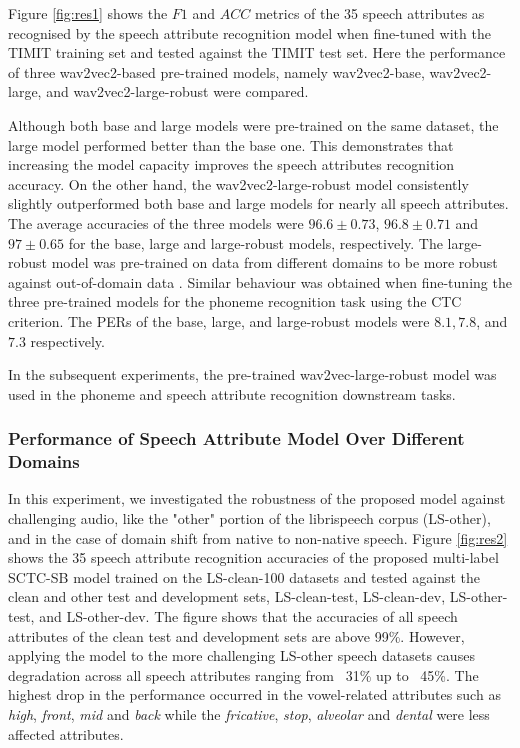 \documentclass[12pt]{elsarticle}
\begin{document}
Figure \ref{fig:res1} shows the $F1$ and $ACC$ metrics of the 35 speech attributes as recognised by the speech attribute recognition model when fine-tuned with the TIMIT training set and tested against the TIMIT test set. Here the performance of three wav2vec2-based pre-trained models, namely wav2vec2-base, wav2vec2-large, and wav2vec2-large-robust were compared.

Although both base and large models were pre-trained on the same dataset, the large model performed better than the base one. This demonstrates that increasing the model capacity improves the speech attributes recognition accuracy. On the other hand, the wav2vec2-large-robust model consistently slightly outperformed both base and large models for nearly all speech attributes. The average accuracies of the three models were $96.6\pm0.73$, $96.8\pm0.71$ and $97\pm0.65$ for the base, large and large-robust models, respectively. The large-robust model was pre-trained on data from different domains to be more robust against out-of-domain data \cite{RN231}. Similar behaviour was obtained when fine-tuning the three pre-trained models for the phoneme recognition task using the CTC criterion. The PERs of the base, large, and large-robust models were $8.1, 7.8$, and $7.3$ respectively.

In the subsequent experiments, the pre-trained wav2vec-large-robust model was used in the phoneme and speech attribute recognition downstream tasks.

\subsubsection{Performance of Speech Attribute Model Over Different Domains}

In this experiment, we investigated the robustness of the proposed model against challenging audio, like the "other" portion of the librispeech corpus (LS-other), and  in the case of domain shift from native to non-native speech. Figure \ref{fig:res2} shows the 35 speech attribute recognition accuracies of the proposed multi-label SCTC-SB model trained on the LS-clean-100 datasets and tested against the clean and other test and development sets, LS-clean-test, LS-clean-dev, LS-other-test, and LS-other-dev. The figure shows that the accuracies of all speech attributes of the clean test and development sets are above 99\%. However, applying the model to the more challenging LS-other speech datasets causes degradation across all speech attributes ranging from ~31\% up to ~45\%. The highest drop in the performance occurred in the vowel-related attributes such as \textit{high}, \textit{front}, \textit{mid} and \textit{back} while the \textit{fricative}, \textit{stop}, \textit{alveolar} and \textit{dental} were less affected attributes.
\end{document}
